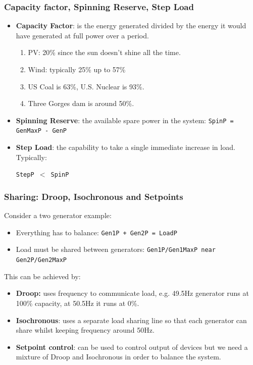 \documentclass{beamer}
\begin{document}
\begin{frame}\frametitle{Capacity factor, Spinning Reserve, Step Load}
  \begin{itemize}
  \item \textbf{Capacity Factor}: is the energy generated divided by the
    energy it would have generated at full power over a period.
    \pause
    \begin{enumerate}
    \item PV: 20\% since the sun doesn't shine all the time.
    \item Wind: typically 25\% up to 57\% 
    \item US Coal is 63\%, U.S. Nuclear is 93\%.
    \item Three Gorges dam is around 50\%.
    \end{enumerate}
    \pause
  \item \textbf{Spinning Reserve}: the available spare power
    in the system: 
    \texttt{SpinP = GenMaxP - GenP}
    \pause
  \item \textbf{Step Load}: the capability to take a single
    immediate increase in load. Typically: 

    \texttt{StepP $<$ SpinP}
  \end{itemize}
\end{frame}

\begin{frame}\frametitle{Sharing: Droop, Isochronous and Setpoints}
Consider a two generator example:\pause
  \begin{itemize}
  \item Everything has to balance: \texttt{Gen1P + Gen2P = LoadP}\pause
  \item Load must be shared between generators: 
    \texttt{Gen1P/Gen1MaxP near Gen2P/Gen2MaxP}
  \end{itemize}
  This can be achieved by:
  \begin{itemize}
  \item \textbf{Droop:} uses frequency to communicate load, e.g.
    49.5Hz generator runs at 100\% capacity, at 50.5Hz it runs at 0\%.
    \pause
  \item \textbf{Isochronous}: uses a separate load sharing line 
    so that each generator can share whilst keeping frequency around
    50Hz.\pause
  \item \textbf{Setpoint control}: can be used to control output of
    devices but we need a mixture of Droop and Isochronous in order to
    balance the system.
  \end{itemize}
\end{frame}
\end{document}
